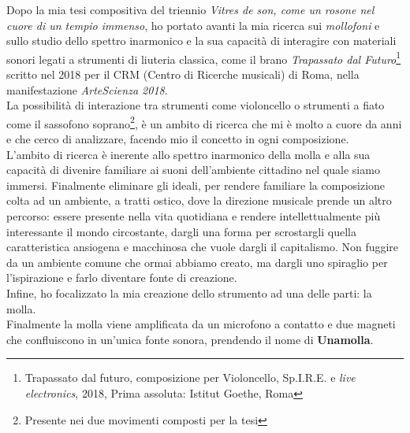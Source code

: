 Dopo la mia tesi compositiva del triennio \textit{Vitres de son, come un rosone nel cuore di un tempio immenso}, ho portato avanti la mia ricerca sui \textit{mollofoni} e sullo studio dello spettro inarmonico e la sua capacità di interagire con materiali sonori legati a strumenti di liuteria classica, come il brano \textit{Trapassato dal Futuro}\footnote{Trapassato dal futuro, composizione per Violoncello, Sp.I.R.E. e \textit{live electronics}, 2018, Prima assoluta: Istitut Goethe, Roma} scritto nel 2018 per il CRM (Centro di Ricerche musicali) di Roma, nella manifestazione \textit{ArteScienza 2018}. \\
La possibilità di interazione tra strumenti come violoncello o strumenti a fiato come il sassofono soprano\footnote{Presente nei due movimenti composti per la tesi}, è un ambito di ricerca che mi è molto a cuore da anni e che cerco di analizzare, facendo mio il concetto in ogni composizione. \\
L'ambito di ricerca è inerente allo spettro inarmonico della molla e alla sua capacità di divenire familiare ai suoni dell'ambiente cittadino nel quale siamo immersi. Finalmente eliminare gli ideali, per rendere familiare la composizione colta ad un ambiente, a tratti ostico, dove la direzione musicale prende un altro percorso: essere presente nella vita quotidiana e rendere intellettualmente più interessante il mondo circostante, dargli una forma per scrostargli quella caratteristica ansiogena e macchinosa che vuole dargli il capitalismo. Non fuggire da un ambiente comune che ormai abbiamo creato, ma dargli uno spiraglio per l'ispirazione e farlo diventare fonte di creazione. \\
Infine, ho focalizzato la mia creazione dello strumento ad una delle parti: la molla. \\
Finalmente la molla viene amplificata da un microfono a contatto e due magneti che confluiscono in un'unica fonte sonora, prendendo il nome di \textbf{Unamolla}.